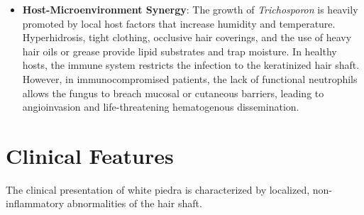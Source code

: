 \begin{itemize}
    \item \textbf{Host-Microenvironment Synergy}: The growth of \textit{Trichosporon} is heavily promoted by local host factors that increase humidity and temperature. Hyperhidrosis, tight clothing, occlusive hair coverings, and the use of heavy hair oils or grease provide lipid substrates and trap moisture. In healthy hosts, the immune system restricts the infection to the keratinized hair shaft. However, in immunocompromised patients, the lack of functional neutrophils allows the fungus to breach mucosal or cutaneous barriers, leading to angioinvasion and life-threatening hematogenous dissemination.
\end{itemize}

\section*{Clinical Features}
The clinical presentation of white piedra is characterized by localized, non-inflammatory abnormalities of the hair shaft.

